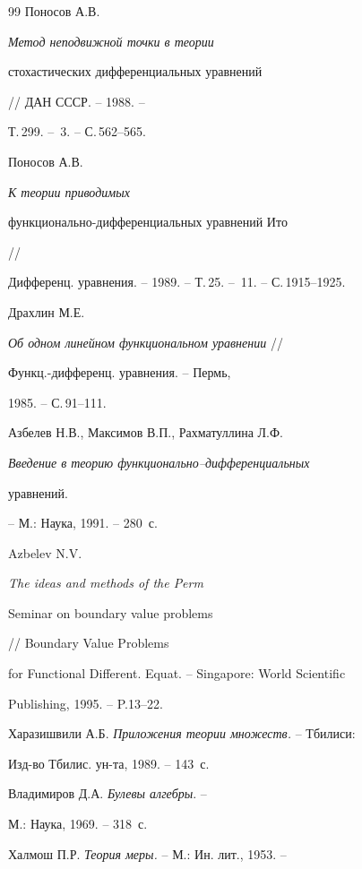 \begin{thebibliography}{99}
 Поносов А.В. {\it Метод неподвижной точки в теории


стохастических дифференциальных уравнений} // ДАН СССР. -- 1988. --


Т.\,299. -- \No\,3. -- С.\,562--565.





 Поносов А.В. {\it К теории приводимых


функ\-ци\-о\-наль\-но-диф\-фе\-рен\-ци\-аль\-ных уравнений Ито} //


Дифференц. уравнения. -- 1989. -- Т.\,25. -- \No\,11. -- С.\,1915--1925.





 Драхлин М.Е.


{\it Об одном линейном функциональном уравнении} //


Функц.-дифференц. уравнения. -- Пермь,


1985. -- С.\,91--111.





 Азбелев Н.В., Максимов В.П., Рахматуллина Л.Ф.


{\it Введение в теорию функ\-ци\-о\-наль\-но--диф\-фе\-рен\-ци\-аль\-ных


уравнений.} -- М.: Наука, 1991. -- 280~с.





 Azbelev N.V. {\it The ideas and methods of the Perm


Seminar on boundary value problems} // Boundary Value Problems


for Functional Different. Equat. -- Singapore: World Scientific


Publishing, 1995. -- P.\.13--22.





 Харазишвили А.Б. {\it Приложения теории множеств.} -- Тбилиси:


Изд-во Тбилис. ун-та, 1989. -- 143~с.





 Владимиров Д.А. {\it Булевы алгебры}. --


М.: Наука, 1969. -- 318~с.





 Халмош П.Р. {\it Теория меры.} -- М.: Ин. лит., 1953. --



\end{thebibliography}
